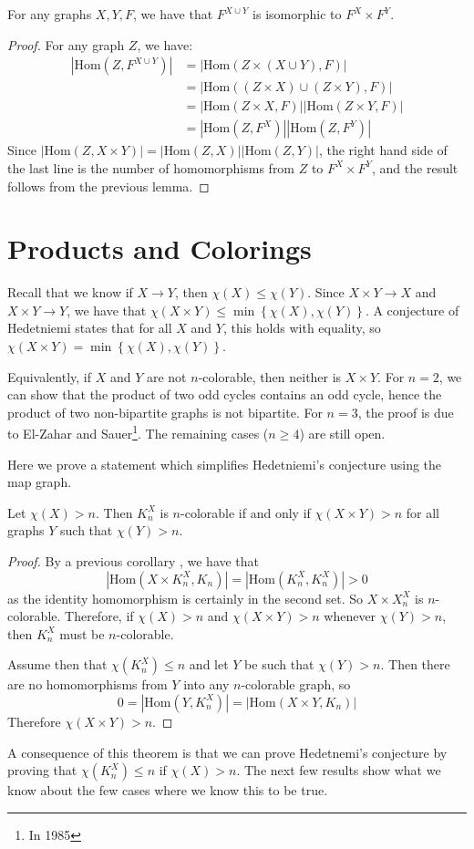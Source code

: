 \begin{lemma}
	For any graphs $X,Y,F$, we have that $F^{X\cup Y}$ is isomorphic to $F^X\times F^Y$.
\end{lemma}

\begin{proof}
	For any graph $Z$, we have:
	\begin{align*}
	|\text{Hom}(Z,F^{X\cup Y})|&=|\text{Hom}(Z\times(X\cup Y),F)|\\
	                    &=|\text{Hom}((Z\times X)\cup (Z\times Y),F)|\\
	                    &=|\text{Hom}(Z\times X,F)||\text{Hom}(Z\times Y,F)|\\
	                    &=|\text{Hom}(Z,F^X)||\text{Hom}(Z,F^Y)|
	\end{align*}
	Since $|\text{Hom}(Z,X\times Y)|=|\text{Hom}(Z,X)||\text{Hom}(Z,Y)|$, the right hand side of the last line is the number of homomorphisms from $Z$ to $F^X\times F^Y$, and the result follows from the previous lemma.
\end{proof}

\section*{Products and Colorings}

Recall that we know if $X\rightarrow Y$, then $\chi(X)\leq \chi(Y)$.  Since $X\times Y\rightarrow X$ and $X\times Y\rightarrow Y$, we have that $\chi(X\times Y)\leq\min\left\{\chi(X),\chi(Y)\right\}$.  A conjecture of Hedetniemi states that for all $X$ and $Y$, this holds with equality, so $\chi(X\times Y)=\min\left\{\chi(X),\chi(Y)\right\}$.  

Equivalently, if $X$ and $Y$ are not $n$-colorable, then neither is $X\times Y$.  For $n=2$, we can show that the product of two odd cycles contains an odd cycle, hence the product of two non-bipartite graphs is not bipartite.  For $n=3$, the proof is due to El-Zahar and Sauer\footnote{In 1985}.  The remaining cases ($n\geq 4$) are still open.

Here we prove a statement which simplifies Hedetniemi's conjecture using the map graph.

\begin{theorem}
	Let $\chi(X)>n$.  Then $K_n^X$ is $n$-colorable if and only if $\chi(X\times Y)>n$ for all graphs $Y$ such that $\chi(Y)>n$.
\end{theorem}
\begin{proof}
	{By a previous corollary , we have that $$|\text{Hom}(X\times K_n^X,K_n)|=|\text{Hom}(K_n^X,K_n^X)|>0$$ as the identity homomorphism is certainly in the second set. So $X\times X_n^X$ is $n$-colorable.  Therefore, if $\chi(X)>n$ and $\chi(X\times Y)>n$ whenever $\chi(Y)>n$, then $K_n^X$ must be $n$-colorable.
	
Assume then that $\chi(K_n^X)\leq n$ and let $Y$ be such that $\chi(Y)>n$.  Then there are no homomorphisms from $Y$ into any $n$-colorable graph, so $$0=|\text{Hom}(Y,K_n^X)|=|\text{Hom}(X\times Y,K_n)|$$ Therefore $\chi(X\times Y)>n$. }
\end{proof}

A consequence of this theorem is that we can prove Hedetnemi's conjecture by proving that $\chi(K_n^X)\leq n$ if $\chi(X)>n$.  The next few results show what we know about the few cases where we know this to be true.

